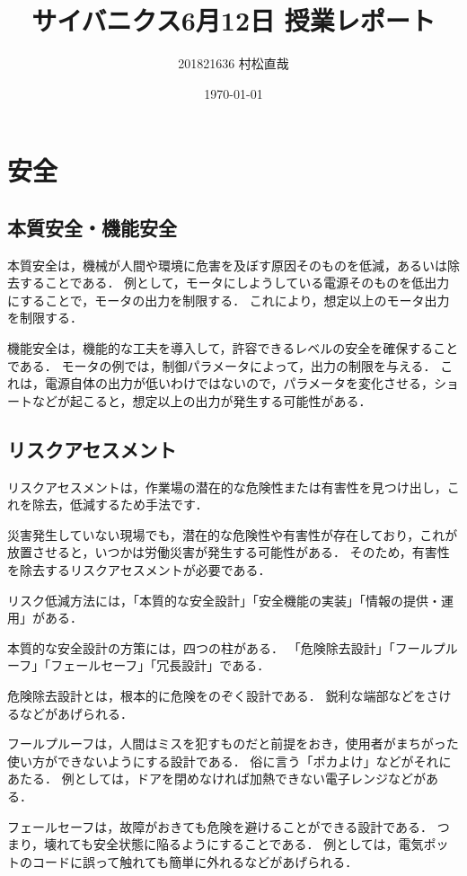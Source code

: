 \documentclass[uplatex,a4paper]{jsarticle}
\title{サイバニクス6月12日 授業レポート}
\author{201821636 村松直哉}
\date{\today}
\begin{document}
\maketitle
%
%
\section{安全}
\subsection{本質安全・機能安全}
本質安全は，機械が人間や環境に危害を及ぼす原因そのものを低減，あるいは除去することである．
例として，モータにしようしている電源そのものを低出力にすることで，モータの出力を制限する．
これにより，想定以上のモータ出力を制限する．

機能安全は，機能的な工夫を導入して，許容できるレベルの安全を確保することである．
モータの例では，制御パラメータによって，出力の制限を与える．
これは，電源自体の出力が低いわけではないので，パラメータを変化させる，ショートなどが起こると，想定以上の出力が発生する可能性がある．


\subsection{リスクアセスメント}
リスクアセスメントは，作業場の潜在的な危険性または有害性を見つけ出し，これを除去，低減するため手法です．

災害発生していない現場でも，潜在的な危険性や有害性が存在しており，これが放置させると，いつかは労働災害が発生する可能性がある．
そのため，有害性を除去するリスクアセスメントが必要である．

リスク低減方法には，「本質的な安全設計」「安全機能の実装」「情報の提供・運用」がある．


本質的な安全設計の方策には，四つの柱がある．
「危険除去設計」「フールプルーフ」「フェールセーフ」「冗長設計」である．

危険除去設計とは，根本的に危険をのぞく設計である．
鋭利な端部などをさけるなどがあげられる．

フールプルーフは，人間はミスを犯すものだと前提をおき，使用者がまちがった使い方ができないようにする設計である．
俗に言う「ポカよけ」などがそれにあたる．
例としては，ドアを閉めなければ加熱できない電子レンジなどがある．

フェールセーフは，故障がおきても危険を避けることができる設計である．
つまり，壊れても安全状態に陥るようにすることである．
例としては，電気ポットのコードに誤って触れても簡単に外れるなどがあげられる．
\end{document}
